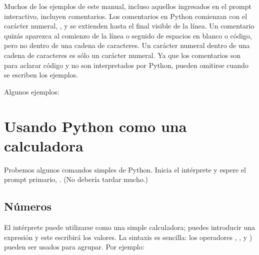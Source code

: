 \documentclass[a5paper,10pt,spanish]{sphinxmanual}
\begin{document}
\ignorespaces 
\sphinxAtStartPar
Muchos de los ejemplos de este manual, incluso aquellos ingresados en el prompt interactivo, incluyen comentarios. Los comentarios en Python comienzan con el carácter numeral, \sphinxcode{\sphinxupquote{\#}}, y se extienden hasta el final visible de la línea. Un comentario quizás aparezca al comienzo de la línea o seguido de espacios en blanco o código, pero no dentro de una cadena de caracteres. Un carácter numeral dentro de una cadena de caracteres es sólo un carácter numeral. Ya que los comentarios son para aclarar código y no son interpretados por Python, pueden omitirse cuando se escriben los ejemplos.

\sphinxAtStartPar
Algunos ejemplos:

\begin{sphinxVerbatim}[commandchars=\\\{\}]
    
  
\end{sphinxVerbatim}


\section{Usando Python como una calculadora}
\label{\detokenize{tutorial/introduction:using-python-as-a-calculator}}\label{\detokenize{tutorial/introduction:tut-calculator}}
\sphinxAtStartPar
Probemos algunos comandos simples de Python. Inicia el intérprete y espere el prompt primario, \sphinxcode{\sphinxupquote{>>>}}. (No debería tardar mucho.)


\subsection{Números}
\label{\detokenize{tutorial/introduction:numbers}}\label{\detokenize{tutorial/introduction:tut-numbers}}
\sphinxAtStartPar
El intérprete puede utilizarse como una simple calculadora; puedes introducir una expresión y este escribirá los valores. La sintaxis es sencilla: los operadores \sphinxcode{\sphinxupquote{+}}, \sphinxcode{\sphinxupquote{\sphinxhyphen{}}}, \sphinxcode{\sphinxupquote{*}} y ) pueden ser usados para agrupar. Por ejemplo:
\end{document}
